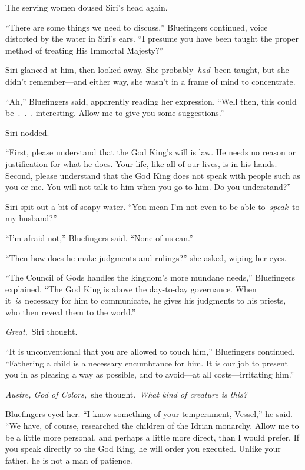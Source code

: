 The serving women doused Siri’s head again.

“There are some things we need to discuss,” Bluefingers continued, voice distorted by the water in Siri’s ears. “I presume you have been taught the proper method of treating His Immortal Majesty?”

Siri glanced at him, then looked away. She probably~\textit{had}~been taught, but she didn’t remember—and either way, she wasn’t in a frame of mind to concentrate.

“Ah,” Bluefingers said, apparently reading her expression. “Well then, this could be~.~.~. interesting. Allow me to give you some suggestions.”

Siri nodded.

“First, please understand that the God King’s will is law. He needs no reason or justification for what he does. Your life, like all of our lives, is in his hands. Second, please understand that the God King does not speak with people such as you or me. You will not talk to him when you go to him. Do you understand?”

Siri spit out a bit of soapy water. “You mean I’m not even to be able to~\textit{speak}~to my husband?”

“I’m afraid not,” Bluefingers said. “None of us can.”

“Then how does he make judgments and rulings?” she asked, wiping her eyes.

“The Council of Gods handles the kingdom’s more mundane needs,” Bluefingers explained. “The God King is above the day-to-day governance. When it~\textit{is}~necessary for him to communicate, he gives his judgments to his priests, who then reveal them to the world.”

\textit{Great,}~Siri thought.

“It is unconventional that you are allowed to touch him,” Bluefingers continued. “Fathering a child is a necessary encumbrance for him. It is our job to present you in as pleasing a way as possible, and to avoid—at all costs—irritating him.”

\textit{Austre, God of Colors,}~she thought.~\textit{What kind of creature is this?}

Bluefingers eyed her. “I know something of your temperament, Vessel,” he said. “We have, of course, researched the children of the Idrian monarchy. Allow me to be a little more personal, and perhaps a little more direct, than I would prefer. If you speak directly to the God King, he will order you executed. Unlike your father, he is not a man of patience.

